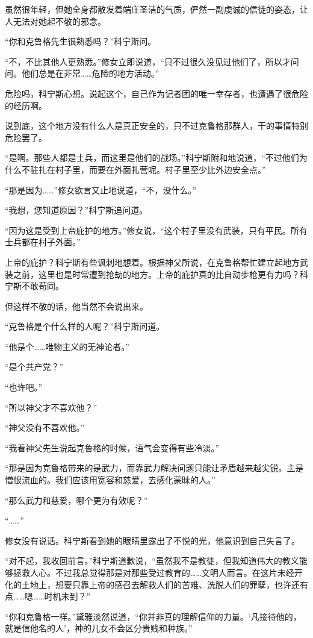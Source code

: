 虽然很年轻，但她全身都散发着端庄圣洁的气质，俨然一副虔诚的信徒的姿态，让人无法对她起不敬的邪念。

“你和克鲁格先生很熟悉吗？”科宁斯问。

“不，不比其他人更熟悉。”修女立即说道，“只不过很久没见过他们了，所以才问问。他们总是在非常……危险的地方活动。”

危险吗，科宁斯心想。说起这个，自己作为记者团的唯一幸存者，也遭遇了很危险的经历啊。

说到底，这个地方没有什么人是真正安全的，只不过克鲁格那群人，干的事情特别危险罢了。

“是啊。那些人都是士兵，而这里是他们的战场。”科宁斯附和地说道，“不过他们为什么不驻扎在村子里，而要在外面扎营呢。村子里至少比外边安全点。”

“那是因为……”修女欲言又止地说道，“不，没什么。”

“我想，您知道原因？”科宁斯追问道。

“因为这是受到上帝庇护的地方。”修女说，“这个村子里没有武装，只有平民。所有士兵都在村子外面。”

上帝的庇护？科宁斯有些讽刺地想着。根据神父所说，在克鲁格帮忙建立起地方武装之前，这里也是时常遭到抢劫的地方。上帝的庇护真的比自动步枪更有力吗？科宁斯不敢苟同。

但这样不敬的话，他当然不会说出来。

“克鲁格是个什么样的人呢？”科宁斯问道。

“他是个……唯物主义的无神论者。”

“是个共产党？”

“也许吧。”

“所以神父才不喜欢他？”

“神父没有不喜欢他。”

“我看神父先生说起克鲁格的时候，语气会变得有些冷淡。”

“那是因为克鲁格带来的是武力，而靠武力解决问题只能让矛盾越来越尖锐。主是憎恨流血的。我们应该用宽容和慈爱，去感化蒙昧的人。”

“那么武力和慈爱，哪个更为有效呢？”

“……”

修女没有说话。科宁斯看到她的眼睛里露出了不悦的光，他意识到自己失言了。

“对不起，我收回前言。”科宁斯道歉说，“虽然我不是教徒，但我知道伟大的教义能够拯救人心。不过我总觉得那是对那些受过教育的……文明人而言。在这片未经开化的土地上，想要只靠上帝的感召去解救人们的苦难、洗脱人们的罪孽，也许还有点……嗯……时机未到？”

“你和克鲁格一样。”黛雅淡然说道，“你并非真的理解信仰的力量。‘凡接待他的，就是信他名的人’，神的儿女不会区分贵贱和种族。”

